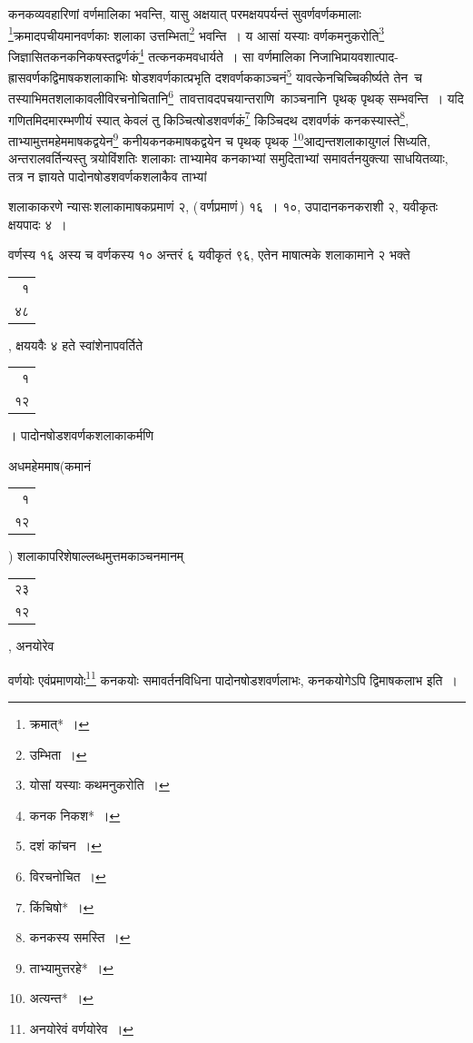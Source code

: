 \documentclass[10pt, openany]{book}
\begin{document}
{{{कनकव्यवहारिणां वर्णमालिका भवन्ति, यासु अक्षयात् परमक्षयपर्यन्तं
सुवर्णवर्णकमालाः \renewcommand{\thefootnote}{\s १३}\footnote{\s क्रमात्*~।}क्रमादपचीयमानवर्णकाः शलाका उत्तम्भिता\renewcommand{\thefootnote}{\s १४}\footnote{\s उम्भिता~।} भवन्ति~। य आसां यस्याः
वर्णकमनुकरोति\renewcommand{\thefootnote}{\s १५}\footnote{\s योसां यस्याः
कथमनुकरोति~।}}
{जिज्ञासितकनकनिकषस्तद्वर्णकं\renewcommand{\thefootnote}{\s १६}\footnote{\s *कनक निकश*~।} तत्कनकमवधार्यते~। सा वर्णमालिका
निजाभिप्रायवशात्पाद-ह्रासवर्णकद्विमाषकशलाकाभिः षोडशवर्णकात्प्रभृति दशवर्णककाञ्चनं\renewcommand{\thefootnote}{\s १७}\footnote{\s दशं कांचन~।}
यावत्केनचिच्चिकीर्ष्यते}
{तेन \,च \,तस्याभिमतशलाकावलीविरचनोचितानि\renewcommand{\thefootnote}{\s १८}\footnote{\s *विरचनोचित~।} \,तावत्तावदपचयान्तराणि \,काञ्चनानि \,पृथक्}
{पृथक् सम्भवन्ति~। यदि गणितमिदमारम्भणीयं स्यात् केवलं तु
किञ्चित्षोडशवर्णकं\renewcommand{\thefootnote}{\s १९}\footnote{\s किंचिषो*~।} किञ्चिदथ}
{दशवर्णकं कनकस्यास्ते\renewcommand{\thefootnote}{\s २०}\footnote{\s कनकस्य
समस्ति~।}, ताभ्यामुत्तमहेममाषकद्वयेन\renewcommand{\thefootnote}{\s २१}\footnote{\s ताभ्यामुत्तरहे*~।}
कनीयकनकमाषकद्वयेन च पृथक् पृथक्}
{\renewcommand{\thefootnote}{\s २२}\footnote{\s अत्यन्त*~।}आद्यन्तशलाकायुगलं सिध्यति, अन्तरालवर्तिन्यस्तु त्रयोविंशतिः शलाकाः
ताभ्यामेव कनकाभ्यां}
{समुदिताभ्यां समावर्तनयुक्त्या साधयितव्याः, तत्र न ज्ञायते
पादोनषोडशवर्णकशलाकैव ताभ्यां}

\newpage

\vspace{3mm}

{शलाकाकरणे न्यासः\textendash \,शलाकामाषकप्रमाणं २, (\,वर्णप्रमाणं\,) १६~। १०,
उपादानकनकराशी २, यवीकृतः क्षयपादः ४~।}
\vspace{3mm}

{वर्णस्य १६ अस्य च वर्णकस्य १० अन्तरं ६ यवीकृतं ९६, एतेन माषात्मके
शलाकामाने २ भक्ते\begin{tabular}{r}१\\ ४८\end{tabular}, क्षययवैः ४ हते स्वांशेनापवर्तिते\begin{tabular}{r}१\\ १२\end{tabular}।
पादोनषोडशवर्णकशलाकाकर्मणि}
{अधमहेममाष\bigg(कमानं\begin{tabular}{r}१\\ १२\end{tabular}\bigg) शलाकापरिशेषाल्लब्धमुत्तमकाञ्चनमानम्\begin{tabular}{r}२३ \\१२\end{tabular},
अनयोरेव}
{वर्णयोः एवंप्रमाणयोः\renewcommand{\thefootnote}{\s ३}\footnote{\s अनयोरेवं
वर्णयोरेव~।} कनकयोः समावर्तनविधिना पादोनषोडशवर्णलाभः,
कनकयोगेऽपि}
{द्विमाषकलाभ इति~।}
\vspace{3mm}

}}
\end{document}
